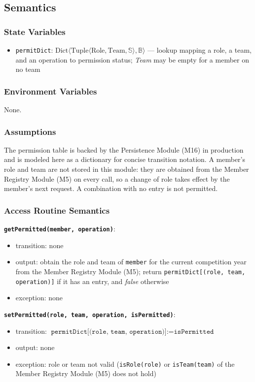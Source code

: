 \documentclass[12pt, titlepage]{article}
\begin{document}
\subsection{Semantics}

\subsubsection{State Variables}
\begin{itemize}
  \item \texttt{permitDict}: $\text{Dict}\langle \text{Tuple}\langle \text{Role}, \text{Team}, \mathbb{S} \rangle, \mathbb{B} \rangle$ --- lookup mapping a role, a team, and an operation to permission status; \textit{Team} may be empty for a member on no team
\end{itemize}

\subsubsection{Environment Variables}
None.

\subsubsection{Assumptions}
The permission table is backed by the Persistence Module (M16) in production and is modeled here as a dictionary for concise transition notation. A member's role and team are not stored in this module: they are obtained from the Member Registry Module (M5) on every call, so a change of role takes effect by the member's next request. A combination with no entry is not permitted.

\subsubsection{Access Routine Semantics}

\textbf{\texttt{getPermitted(member, operation)}}:
\begin{itemize}
  \item transition: none
  \item output: obtain the role and team of \texttt{member} for the current competition year from the Member Registry Module (M5); return \texttt{permitDict[(role, team, operation)]} if it has an entry, and \textit{false} otherwise
  \item exception: none
\end{itemize}

\textbf{\texttt{setPermitted(role, team, operation, isPermitted)}}:
\begin{itemize}
  \item transition: $\texttt{permitDict[(role, team, operation)]} := \texttt{isPermitted}$
  \item output: none
  \item exception: role or team not valid (\texttt{isRole(role)} or \texttt{isTeam(team)} of the Member Registry Module (M5) does not hold)
\end{itemize}
\end{document}
